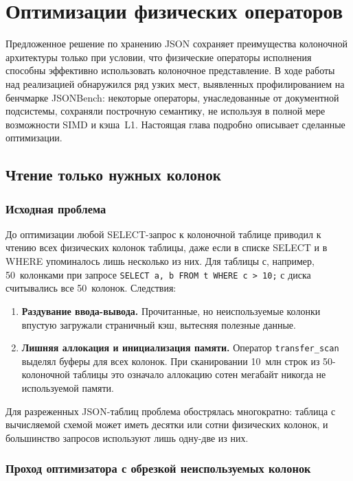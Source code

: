\chapter{Оптимизации физических операторов}

Предложенное решение по хранению JSON сохраняет преимущества
колоночной архитектуры только при условии, что физические операторы
исполнения способны эффективно использовать колоночное представление.
В ходе работы над реализацией обнаружился ряд узких мест, выявленных
профилированием на бенчмарке JSONBench: некоторые операторы,
унаследованные от документной подсистемы, сохраняли построчную
семантику, не используя в полной мере возможности SIMD и кэша~L1.
Настоящая глава подробно описывает сделанные оптимизации.

\section{Чтение только нужных колонок}

\subsection{Исходная проблема}

До оптимизации любой SELECT-запрос к колоночной таблице приводил
к чтению всех физических колонок таблицы, даже если в списке
SELECT и в WHERE упоминалось лишь несколько из них. Для таблицы с,
например, 50~колонками при запросе
\texttt{SELECT a, b FROM t WHERE c > 10;} с диска считывались все
50~колонок. Следствия:

\begin{enumerate}
    \item \textbf{Раздувание ввода-вывода.} Прочитанные, но
    неиспользуемые колонки впустую загружали страничный кэш,
    вытесняя полезные данные.
    \item \textbf{Лишняя аллокация и инициализация памяти.}
    Оператор \texttt{transfer\_scan} выделял буферы для всех
    колонок. При сканировании 10~млн строк из 50-колоночной таблицы
    это означало аллокацию сотен мегабайт никогда не используемой
    памяти.
\end{enumerate}

Для разреженных JSON-таблиц проблема обострялась многократно:
таблица с вычисляемой схемой может иметь десятки или сотни
физических колонок, и большинство запросов используют лишь одну-две
из них.

\subsection{Проход оптимизатора с обрезкой неиспользуемых колонок}

